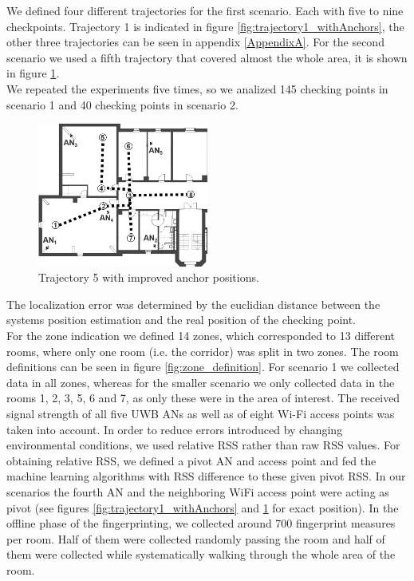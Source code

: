 \noindent\hspace*{5mm}%
We defined four different trajectories for the first scenario. Each with five to nine checkpoints. Trajectory 1 is indicated in figure \ref{fig:trajectory1_withAnchors}, the other three trajectories can be seen in appendix \ref{AppendixA}.
For the second scenario we used a fifth trajectory that covered almost the whole area, it is shown in figure \ref{fig:trajectory5_withAnchors}.\\
\noindent\hspace*{5mm}%
We repeated the experiments five times, so we analized 145 checking points in scenario 1 and 40 checking points in scenario 2.\begin{figure}[th]
\centering
\includegraphics[width=0.5\textwidth]{Figures/trajectory5_withAnchors}
\decoRule
\caption[Trajectory 5]{Trajectory 5 with improved anchor positions.}
\label{fig:trajectory5_withAnchors}
\end{figure}
The localization error was determined by the euclidian distance between the systems position estimation and the real position of the checking point.\\
\noindent\hspace*{5mm}%
For the zone indication we defined 14 zones, which corresponded to 13 different rooms, where only one room (i.e. the corridor) was split in two zones. The room definitions can be seen in figure \ref{fig:zone_definition}. For scenario 1 we collected data in all zones, whereas for the smaller scenario we only collected data in the rooms 1, 2, 3, 5, 6 and 7, as only these were in the area of interest. The received signal strength of all five UWB ANs as well as of eight Wi-Fi access points was taken into account. In order to reduce errors introduced by changing environmental conditions, we used relative RSS rather than raw RSS values. For obtaining relative RSS, we defined a pivot AN and access point and fed the machine learning algorithms with RSS difference to these given pivot RSS. In our scenarios the fourth AN and the neighboring WiFi access point were acting as pivot (see figures \ref{fig:trajectory1_withAnchors} and \ref{fig:trajectory5_withAnchors} for exact position). In the offline phase of the fingerprinting, we collected around 700 fingerprint measures per room. Half of them were collected randomly passing the room and half of them were collected while systematically walking through the whole area of the room.
